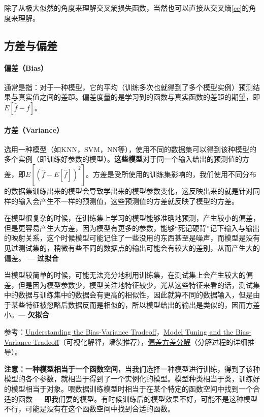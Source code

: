 除了从极大似然的角度来理解交叉熵损失函数，当然也可以直接从交叉熵\ref{ce}的角度来理解。

\subsection{方差与偏差}
\paragraph{偏差（Bias）}通常是指：对于一种模型，它的平均（训练多次也就得到了多个模型实例）预测结果与真实值之间的差距。偏差度量的是学习到的函数与真实函数的差距的期望，即$E[\hat{f} - f]$。

\paragraph{方差（Variance）}选用一种模型（如KNN，SVM，NN等），使用不同的数据集可以得到该种模型的多个实例（即训练好参数的模型）。\textbf{这些模型}对于同一个输入给出的预测值的方差，即$E[(\hat{f} - E[\hat{f}])^2]$。方差是受所使用的训练集影响的，我们使用不同分布的数据集训练出来的模型会导致学出来的模型参数变化，这反映出来的就是针对同样的输入会产生不一样的预测值，这些预测值的方差就反映了模型的方差。

在模型很复杂的时候，在训练集上学习的模型能够准确地预测，产生较小的偏差，但是更容易产生大方差，因为模型有更多的参数，能够“死记硬背”记下输入与输出的映射关系，这个时候模型可能记住了一些没用的东西甚至是噪声，而模型是没有见过测试集的，稍微有些不同的数据点的输出可能会有较大的差别，从而产生大的偏差。 --- \textbf{过拟合}

当模型较简单的时候，可能无法充分地利用训练集，在测试集上会产生较大的偏差，但是因为模型参数少，模型关注地特征较少，光从这些特征来看的话，测试集中的数据与训练集中的数据会有更高的相似性，因此就算不同的数据输入，但是由于某些特征被忽略后数据反而是相似的，所以模型给出的输出是类似的，因而方差小。--- \textbf{欠拟合}

参考：\href{http://scott.fortmann-roe.com/docs/BiasVariance.html}{Understanding the Bias-Variance Tradeoff}，\href{http://www.r2d3.us/visual-intro-to-machine-learning-part-2/}{Model Tuning and
	the Bias-Variance Tradeoff}（可视化解释，墙裂推荐），\href{https://www.cnblogs.com/makefile/p/bias-var.html}{偏差方差分解}（分解过程的详细推导）。


\textbf{注意：}\textbf{一种模型相当于一个函数空间}，当我们选择一种模型进行训练，得到了该种模型的各个参数，就相当于得到了一个实例化的模型。模型种类相当于类，训练好的模型相当于对象。喂数据训练模型时相当于在某个特定的函数空间中找到一个合适的函数 --- 即我们要的模型。有时候训练后的模型效果不好，可能不是这种模型不行，可能是没有在这个函数空间中找到合适的函数。


